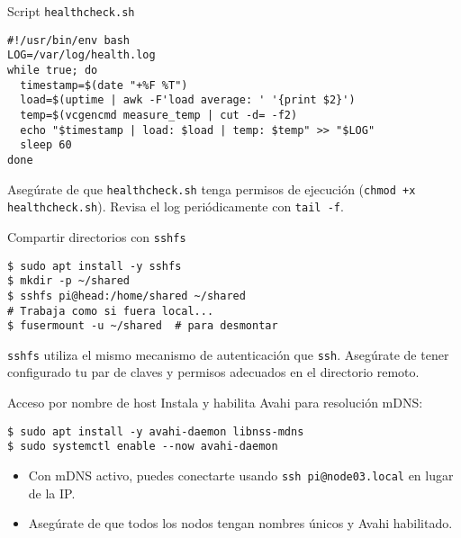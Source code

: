 \documentclass[aspectratio=169,professionalfonts]{beamer}
\begin{document}
\begin{frame}[fragile]{Script \texttt{healthcheck.sh}}
  \begin{verbatim}
#!/usr/bin/env bash
LOG=/var/log/health.log
while true; do
  timestamp=$(date "+%F %T")
  load=$(uptime | awk -F'load average: ' '{print $2}')
  temp=$(vcgencmd measure_temp | cut -d= -f2)
  echo "$timestamp | load: $load | temp: $temp" >> "$LOG"
  sleep 60
done
  \end{verbatim}
  \begin{warnbox}
  Asegúrate de que \texttt{healthcheck.sh} tenga permisos de ejecución (\texttt{chmod +x healthcheck.sh}). Revisa el log periódicamente con \texttt{tail -f}.
  \end{warnbox}
\end{frame}

\begin{frame}[fragile]{Compartir directorios con \texttt{sshfs}}
  \begin{verbatim}
$ sudo apt install -y sshfs
$ mkdir -p ~/shared
$ sshfs pi@head:/home/shared ~/shared
# Trabaja como si fuera local...
$ fusermount -u ~/shared  # para desmontar
  \end{verbatim}
  \begin{infobox}
  \texttt{sshfs} utiliza el mismo mecanismo de autenticación que \texttt{ssh}. Asegúrate de tener configurado tu par de claves y permisos adecuados en el directorio remoto.
  \end{infobox}
\end{frame}

\begin{frame}[fragile]{Acceso por nombre de host}
  Instala y habilita Avahi para resolución mDNS:
  \begin{verbatim}
$ sudo apt install -y avahi-daemon libnss-mdns
$ sudo systemctl enable --now avahi-daemon
  \end{verbatim}
  \begin{itemize}
    \item Con mDNS activo, puedes conectarte usando \texttt{ssh pi@node03.local} en lugar de la IP.
    \item Asegúrate de que todos los nodos tengan nombres únicos y Avahi habilitado.
  \end{itemize}
\end{frame}
\end{document}
